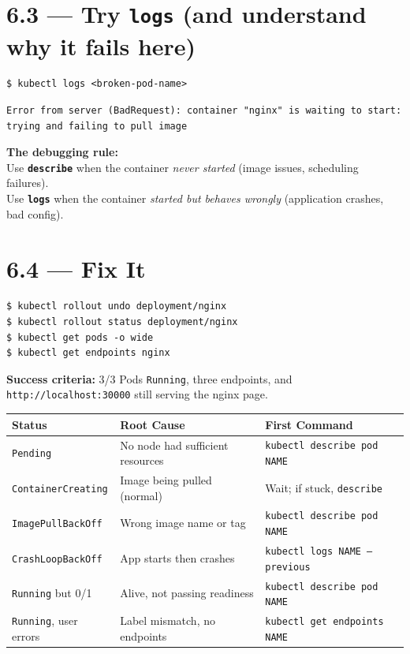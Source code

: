 \documentclass[12pt,a4paper]{report}
\begin{document}
\section{6.3 --- Try \texttt{logs} (and understand why it fails here)}
\begin{lstlisting}
$ kubectl logs <broken-pod-name>
\end{lstlisting}

\begin{tcolorbox}[outputbox]
\begin{lstlisting}[style=terminal,colback=okbg]
Error from server (BadRequest): container "nginx" is waiting to start:
trying and failing to pull image
\end{lstlisting}
\end{tcolorbox}

\begin{tcolorbox}[notebox]
\textbf{The debugging rule:}\\
Use \textbf{\texttt{describe}} when the container \textit{never started} (image issues, scheduling failures).\\
Use \textbf{\texttt{logs}} when the container \textit{started but behaves wrongly} (application crashes, bad config).
\end{tcolorbox}

\section{6.4 --- Fix It}
\begin{lstlisting}
$ kubectl rollout undo deployment/nginx
$ kubectl rollout status deployment/nginx
$ kubectl get pods -o wide
$ kubectl get endpoints nginx
\end{lstlisting}

\textbf{Success criteria:} 3/3 Pods \texttt{Running}, three endpoints, and \texttt{http://localhost:30000} still serving the nginx page.

\begin{center}
\begin{tabular}{lll}
\toprule
Status & Root Cause & First Command \\
\midrule
\texttt{Pending}              & No node had sufficient resources & \texttt{kubectl describe pod NAME} \\
\texttt{ContainerCreating}    & Image being pulled (normal)      & Wait; if stuck, \texttt{describe} \\
\texttt{ImagePullBackOff}     & Wrong image name or tag          & \texttt{kubectl describe pod NAME} \\
\texttt{CrashLoopBackOff}     & App starts then crashes          & \texttt{kubectl logs NAME --previous} \\
\texttt{Running} but 0/1      & Alive, not passing readiness     & \texttt{kubectl describe pod NAME} \\
\texttt{Running}, user errors & Label mismatch, no endpoints     & \texttt{kubectl get endpoints NAME} \\
\bottomrule
\end{tabular}
\end{center}
\end{document}
